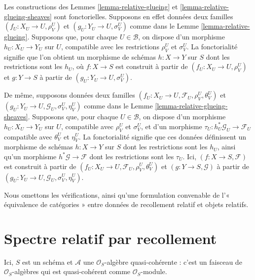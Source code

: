 \begin{remark}
\label{remark-relative-glueing-functorial}
Les constructions des Lemmes \ref{lemma-relative-glueing} et
\ref{lemma-relative-glueing-sheaves} sont fonctorielles.
Supposons en effet données deux familles
$(f_U : X_U \to U, \rho^U_V)$ et
$(g_U : Y_U \to U, \sigma^U_V)$ comme dans le
Lemme \ref{lemma-relative-glueing}. Supposons que, pour chaque
$U \in \mathcal{B}$, on dispose d'un morphisme $h_U : X_U \to Y_U$ sur
$U$, compatible avec les restrictions $\rho^U_V$ et $\sigma^U_V$.
La fonctorialité signifie que l'on obtient un morphisme de schémas
$h : X \to Y$ sur $S$ dont les restrictions sont les $h_U$, où
$f : X \to S$ est construit à partir de
$(f_U : X_U \to U, \rho^U_V)$ et $g : Y \to S$ à partir de
$(g_U : Y_U \to U, \sigma^U_V)$.

\medskip\noindent
De même, supposons données deux familles
$(f_U : X_U \to U, \mathcal{F}_U, \rho^U_V, \theta^U_V)$ et
$(g_U : Y_U \to U, \mathcal{G}_U, \sigma^U_V, \eta^U_V)$ comme dans le
Lemme \ref{lemma-relative-glueing-sheaves}.
Supposons que, pour chaque $U \in \mathcal{B}$, on dispose d'un morphisme
$h_U : X_U \to Y_U$ sur $U$, compatible avec $\rho^U_V$ et $\sigma^U_V$,
et d'un morphisme $\tau_U : h_U^*\mathcal{G}_U \to \mathcal{F}_U$
compatible avec $\theta^U_V$ et $\eta^U_V$.
La fonctorialité signifie que ces données définissent un morphisme de
schémas $h : X \to Y$ sur $S$ dont les restrictions sont les $h_U$, ainsi
qu'un morphisme $h^*\mathcal{G} \to \mathcal{F}$ dont les restrictions
sont les $\tau_U$. Ici, $(f : X \to S, \mathcal{F})$ est construit à
partir de $(f_U : X_U \to U, \mathcal{F}_U, \rho^U_V, \theta^U_V)$ et
$(g : Y \to S, \mathcal{G})$ à partir de
$(g_U : Y_U \to U, \mathcal{G}_U, \sigma^U_V, \eta^U_V)$.

\medskip\noindent
Nous omettons les vérifications, ainsi qu'une formulation convenable de
l'« équivalence de catégories » entre données de recollement relatif et
objets relatifs.
\end{remark}


\section{Spectre relatif par recollement}
\label{section-spec-via-glueing}

\begin{situation}
\label{situation-relative-spec}
Ici, $S$ est un schéma et $\mathcal{A}$ une $\mathcal{O}_S$-algèbre
quasi-cohérente : c'est un faisceau de $\mathcal{O}_S$-algèbres qui est
quasi-cohérent comme $\mathcal{O}_S$-module.
\end{situation}

